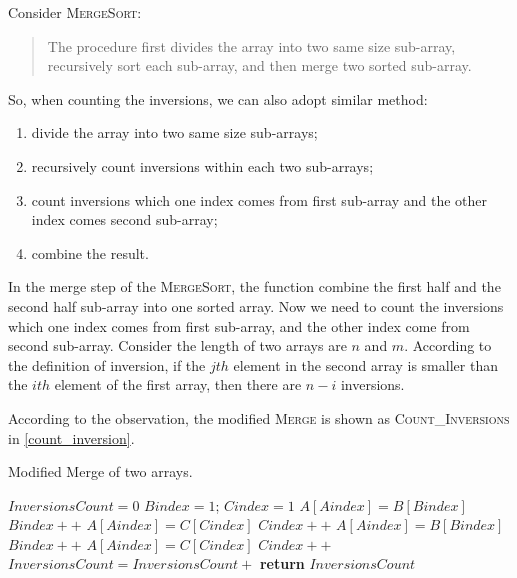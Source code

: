 \begin{homeworkProblem}[Inversions]

Consider \textsc{MergeSort}:

\begin{quote}
    The procedure first divides the array into two same size sub-array, recursively
    sort each sub-array, and then merge two sorted sub-array.
\end{quote}

So, when counting the inversions, we can also adopt similar method:
\begin{enumerate}
\item divide the array into two same size sub-arrays;
\item recursively count inversions within each two sub-arrays;
\item count inversions which one index comes from first sub-array and the other index comes
second sub-array;
\item combine the result.
\end{enumerate}

In the merge step of the \textsc{MergeSort}, the function combine the first half
and the second half sub-array into one sorted array. Now we need to count the
inversions which one index comes from first sub-array, and the other index come
from second sub-array. Consider the length of two arrays are $n$ and $m$.
According to the definition of inversion, if the $jth$ element in the second
array is smaller than the $ith$ element of the first array, then there are $n - i$
inversions.

According to the observation, the modified \textsc{Merge} is shown as \textsc{Count\_Inversions} in \cref{count_inversion}.

\begin{algorithm}[H]
    \caption{Modified Merge of two arrays.} \label{count_inversion}
    \begin{algorithmic}[1]
        \State$InversionsCount = 0$
        \State$Bindex = 1$; $Cindex = 1$
             
                \State $A[Aindex]= B[Bindex]$
                \State $Bindex++$
             
                \State $A[Aindex] = C[Cindex]$
                \State $Cindex++$
             
                \State $A[Aindex] = B[Bindex]$
                \State $Bindex++$
            \Else {}
                \State $A[Aindex] = C[Cindex]$
                \State $Cindex++$
                \State $InversionsCount = InversionsCount + $%
            \EndIf
        \EndFor
        \State \textbf{return } $InversionsCount$
        \EndProcedure
    \end{algorithmic}


\end{algorithm}
\end{homeworkProblem}
